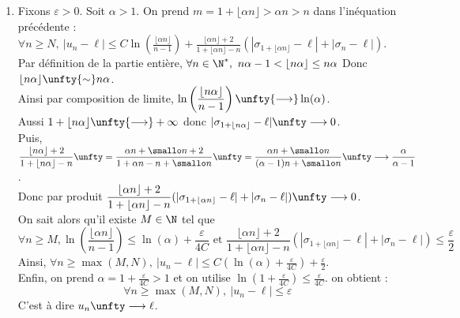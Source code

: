 \documentclass{book}
\begin{document}
\begin{enumerate}[leftmargin=*]
\begin{align*}
			&\leq C\ln\left(\frac{m-1}{n-1}\right)+\frac{m+1}{m-n}(|\sigma_m-\ell|+|\sigma_n-\ell|)
		\end{align*}
		\item Fixons $\varepsilon>0$. Soit $\alpha>1$. On prend $m=1+\lfloor\alpha n\rfloor>\alpha n>n$ dans l'inéquation précédente :\\
		$\forall n\geq N,\ |u_n-\ell|\leq\displaystyle C\ln\left(\frac{\lfloor\alpha n\rfloor}{n-1}\right)+\frac{\lfloor\alpha n\rfloor+2}{1+\lfloor\alpha n\rfloor-n}(|\sigma_{1+\lfloor\alpha n\rfloor}-\ell|+|\sigma_n-\ell|)$.\\
		Par définition de la partie entière, $\forall n\in \N^*,\ n\alpha-1<\lfloor n\alpha\rfloor\leq n\alpha$ Donc $\lfloor n\alpha\rfloor\unfty{\sim} n\alpha$.\\
		Ainsi par composition de limite, $\displaystyle\ln\left(\frac{\lfloor n\alpha\rfloor}{n-1}\right)\unfty{\longrightarrow}\ln(\alpha)$.\\ Aussi $1+\lfloor n\alpha\rfloor\unfty{\longrightarrow}+\infty$ donc $|\sigma_{1+\lfloor n\alpha\rfloor}-\ell|\unfty\longrightarrow 0$. \\Puis, $\displaystyle\frac{\lfloor n\alpha\rfloor+2}{1+\lfloor n\alpha\rfloor-n}\unfty=\frac{\alpha n+\smallo n+2}{1+\alpha n-n+\smallo n}\unfty=\frac{\alpha n+\smallo n}{(\alpha-1)n+\smallo n}\unfty\longrightarrow \frac{\alpha}{\alpha-1}$.\\
		Donc par produit $\displaystyle\frac{\lfloor\alpha n\rfloor+2}{1+\lfloor\alpha n\rfloor-n}(|\sigma_{1+\lfloor\alpha n\rfloor}-\ell|+|\sigma_n-\ell|)\unfty\longrightarrow 0$.\\
		On sait alors qu'il existe $M\in \N$ tel que \[\forall n\geq M,\displaystyle\ln\left(\frac{\lfloor\alpha n\rfloor}{n-1}\right)\leq \ln(\alpha)+\frac{\varepsilon}{4C} \text{ et }\displaystyle\frac{\lfloor\alpha n\rfloor+2}{1+\lfloor\alpha n\rfloor-n}(|\sigma_{1+\lfloor\alpha n\rfloor}-\ell|+|\sigma_n-\ell|)\leq \frac{\varepsilon}{2}\]
		Ainsi, $\forall n\geq \max(M,N),\ |u_n-\ell|\leq \displaystyle C\left(\ln(\alpha)+\frac{\varepsilon}{4C}\right)+\frac{\varepsilon}{2}$.\\
		Enfin, on prend $\alpha=1+\displaystyle\frac{\varepsilon}{4C}>1$ et on utilise $\displaystyle\ln\left(1+\frac{\varepsilon}{4C}\right)\leq \frac{\varepsilon}{4C}$. on obtient :\\
		$$\forall n\geq \max(M,N),\ |u_n-\ell|\leq \varepsilon$$
		C'est à dire $u_n\unfty\longrightarrow \ell$.
	\end{enumerate}
	
\end{document}
